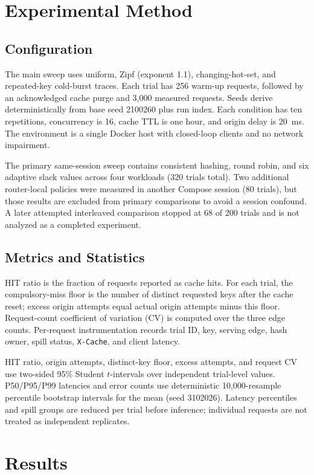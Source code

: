 \documentclass[conference]{IEEEtran}
\begin{document}
\section{Experimental Method}
\subsection{Configuration}
The main sweep uses uniform, Zipf (exponent 1.1), changing-hot-set, and
repeated-key cold-burst traces. Each trial has 256 warm-up requests, followed
by an acknowledged cache purge and 3,000 measured requests. Seeds derive
deterministically from base seed 2100260 plus run index. Each condition has
ten repetitions, concurrency is 16, cache TTL is one hour, and origin delay
is 20~ms. The environment is a single Docker host with closed-loop clients
and no network impairment.

The primary same-session sweep contains consistent hashing, round robin, and
six adaptive slack values across four workloads (320 trials total). Two
additional router-local policies were measured in another Compose session
(80 trials), but those results are excluded from primary comparisons to avoid
a session confound. A later attempted interleaved comparison stopped at 68
of 200 trials and is not analyzed as a completed experiment.

\subsection{Metrics and Statistics}
HIT ratio is the fraction of requests reported as cache hits. For each
trial, the compulsory-miss floor is the number of distinct requested keys
after the cache reset; excess origin attempts equal actual origin attempts
minus this floor. Request-count coefficient of variation (CV) is computed
over the three edge counts. Per-request instrumentation records trial ID,
key, serving edge, hash owner, spill status, \texttt{X-Cache}, and client
latency.

HIT ratio, origin attempts, distinct-key floor, excess attempts, and request
CV use two-sided 95\% Student $t$-intervals over independent trial-level
values. P50/P95/P99 latencies and error counts use deterministic
10,000-resample percentile bootstrap intervals for the mean (seed 3102026).
Latency percentiles and spill groups are reduced per trial before inference;
individual requests are not treated as independent replicates.

\section{Results}
\end{document}
